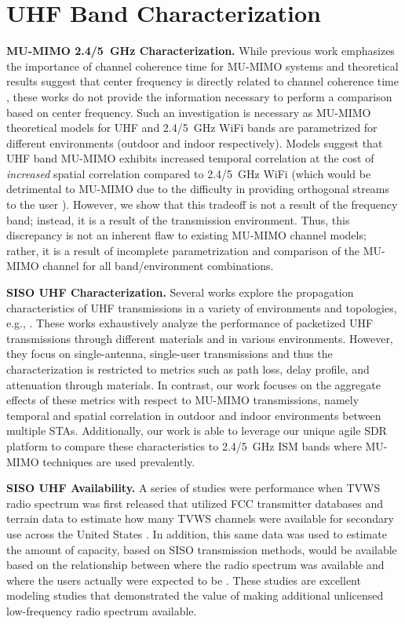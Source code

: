\section{UHF Band Characterization}
\label{sec_related_uhf}

\textbf{MU-MIMO 2.4/5~GHz Characterization.}
	While previous work emphasizes the importance of channel coherence time for \ac{MU-MIMO} systems \cite{aryafar2010design} and theoretical results suggest that center frequency is directly related to channel coherence time \cite{rappaport1996wireless}, these works do not provide the information necessary to perform a comparison based on center frequency.
	Such an investigation is necessary as \ac{MU-MIMO} theoretical models for UHF and 2.4/5~GHz WiFi bands are parametrized for different environments (outdoor and indoor respectively).
	Models suggest that UHF band MU-MIMO exhibits increased temporal correlation  at the cost of \textit{increased} spatial correlation compared to 2.4/5~GHz WiFi (which would be detrimental to \ac{MU-MIMO} due to the difficulty in providing orthogonal streams to the user \cite{aryafar2010design}).
	However, we show that this tradeoff is not a result of the frequency band; instead, it is a result of the transmission environment.  
	Thus, this discrepancy is not an inherent flaw to existing MU-MIMO channel models; rather, it is a result of incomplete parametrization and comparison of the MU-MIMO channel for all band/environment combinations.


\textbf{SISO UHF Characterization.}
	Several works explore the propagation characteristics of UHF transmissions in a variety of environments and topologies, e.g., \cite{hampton2005propagation, pham2007study, ying2013exploring}. 
	These works exhaustively analyze the performance of packetized UHF transmissions through different materials and in various environments.
	However, they focus on single-antenna, single-user transmissions  and thus the characterization is restricted to metrics such as path loss, delay profile, and attenuation through materials.
	In contrast, our work focuses on the aggregate effects of these metrics with respect to \ac{MU-MIMO} transmissions, namely temporal and spatial correlation in outdoor and indoor environments between multiple \acp{STA}.
	Additionally, our work is able to leverage our unique agile \ac{SDR} platform to compare these characteristics to 2.4/5~GHz \ac{ISM} bands where \ac{MU-MIMO} techniques are used prevalently.  


\textbf{SISO UHF Availability.}
	A series of studies were performance when \ac{TVWS} radio spectrum was first released that utilized \ac{FCC} transmitter databases and terrain data to estimate how many \ac{TVWS} channels were available for secondary use across the United States \cite{mishra2009much, mishra2010much}.
	In addition, this same data was used to estimate the amount of capacity, based on \ac{SISO} transmission methods, would be available based on the relationship between where the radio spectrum was available and where the users actually were expected to be \cite{harrison2010much}.
	These studies are excellent modeling studies that demonstrated the value of making additional unlicensed low-frequency radio spectrum available.

